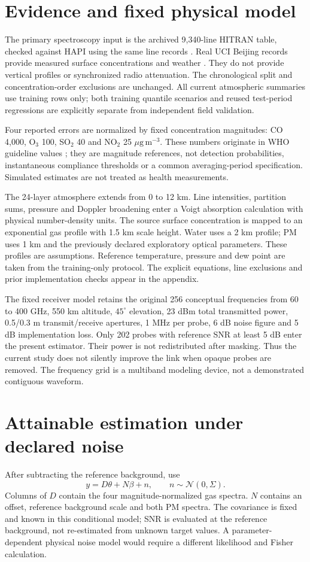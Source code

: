 \documentclass[conference]{IEEEtran}
\newcommand{\ugm}{\ensuremath{\mu\mathrm{g\,m}^{-3}}}
\begin{document}
\section{Evidence and fixed physical model}
The primary spectroscopy input is the archived 9,340-line HITRAN table, checked against HAPI using the same line records \cite{gordon2026hitran,kochanov2016hapi}. Real UCI Beijing records provide measured surface concentrations and weather \cite{chen2017beijing}. They do not provide vertical profiles or synchronized radio attenuation. The chronological split and concentration-order exclusions are unchanged. All current atmospheric summaries use training rows only; both training quantile scenarios and reused test-period regressions are explicitly separate from independent field validation.

Four reported errors are normalized by fixed concentration magnitudes: CO 4,000, O$_3$ 100, SO$_2$ 40 and NO$_2$ 25 \ugm. These numbers originate in WHO guideline values \cite{who2021aqg}; they are magnitude references, not detection probabilities, instantaneous compliance thresholds or a common averaging-period specification. Simulated estimates are not treated as health measurements.

The 24-layer atmosphere extends from 0 to 12 km. Line intensities, partition sums, pressure and Doppler broadening enter a Voigt absorption calculation with physical number-density units. The source surface concentration is mapped to an exponential gas profile with 1.5 km scale height. Water uses a 2 km profile; PM uses 1 km and the previously declared exploratory optical parameters. These profiles are assumptions. Reference temperature, pressure and dew point are taken from the training-only protocol. The explicit equations, line exclusions and prior implementation checks appear in the appendix.

The fixed receiver model retains the original 256 conceptual frequencies from 60 to 400 GHz, 550 km altitude, $45^\circ$ elevation, 23 dBm total transmitted power, 0.5/0.3 m transmit/receive apertures, 1 MHz per probe, 6 dB noise figure and 5 dB implementation loss. Only 202 probes with reference SNR at least 5 dB enter the present estimator. Their power is not redistributed after masking. Thus the current study does not silently improve the link when opaque probes are removed. The frequency grid is a multiband modeling device, not a demonstrated contiguous waveform.

\section{Attainable estimation under declared noise}
After subtracting the reference background, use
\begin{equation}
y=D\theta+N\beta+n,\qquad n\sim\mathcal N(0,\Sigma).
\end{equation}
Columns of $D$ contain the four magnitude-normalized gas spectra. $N$ contains an offset, reference background scale and both PM spectra. The covariance is fixed and known in this conditional model; SNR is evaluated at the reference background, not re-estimated from unknown target values. A parameter-dependent physical noise model would require a different likelihood and Fisher calculation.
\end{document}
